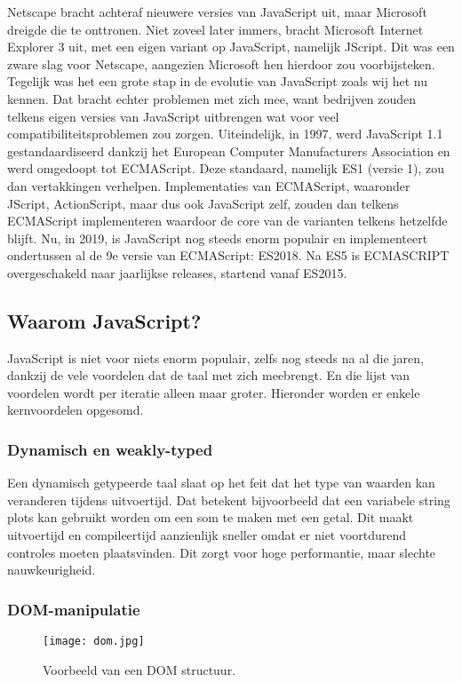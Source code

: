 Netscape bracht achteraf nieuwere versies van JavaScript uit, maar Microsoft dreigde die te onttronen. Niet zoveel later immers, bracht Microsoft Internet Explorer 3 uit, met een eigen variant op JavaScript, namelijk JScript. Dit was een zware slag voor Netscape, aangezien Microsoft hen hierdoor zou voorbijsteken. Tegelijk was het een grote stap in de evolutie van JavaScript zoals wij het nu kennen. Dat bracht echter problemen met zich mee, want bedrijven zouden telkens eigen versies van JavaScript uitbrengen wat voor veel compatibiliteitsproblemen zou zorgen. Uiteindelijk, in 1997, werd JavaScript 1.1 gestandaardiseerd dankzij het European Computer Manufacturers Association en werd omgedoopt tot ECMAScript. \autocite{Wiley2016} Deze standaard, namelijk ES1 (versie 1), zou dan vertakkingen verhelpen. Implementaties van ECMAScript, waaronder JScript, ActionScript, maar dus ook JavaScript zelf, zouden dan telkens ECMAScript implementeren waardoor de core van de varianten telkens hetzelfde blijft. Nu, in 2019, is JavaScript nog steeds enorm populair en implementeert ondertussen al de 9e versie van ECMAScript: ES2018. Na ES5 is ECMASCRIPT overgeschakeld naar jaarlijkse releases, startend vanaf ES2015.

\subsection{Waarom JavaScript?}
\label{sec:jsWhy}

JavaScript is niet voor niets enorm populair, zelfs nog steeds na al die jaren, dankzij de vele voordelen dat de taal met zich meebrengt. En die lijst van voordelen wordt per iteratie alleen maar groter. Hieronder worden er enkele kernvoordelen opgesomd.

\subsubsection{Dynamisch en weakly-typed}
\label{sec:dynamic}

Een dynamisch getypeerde taal slaat op het feit dat het type van waarden kan veranderen tijdens uitvoertijd. Dat betekent bijvoorbeeld dat een variabele string plots kan gebruikt worden om een som te maken met een getal. Dit maakt uitvoertijd en compileertijd aanzienlijk sneller omdat er niet voortdurend controles moeten plaatsvinden. Dit zorgt voor hoge performantie, maar slechte nauwkeurigheid.

\subsubsection{DOM-manipulatie}
\label{sec:DOM}
\begin{figure}
	\texttt{[image: dom.jpg]}
	\caption{Voorbeeld van een DOM structuur.}
	\label{fig:dom}
\end{figure}

